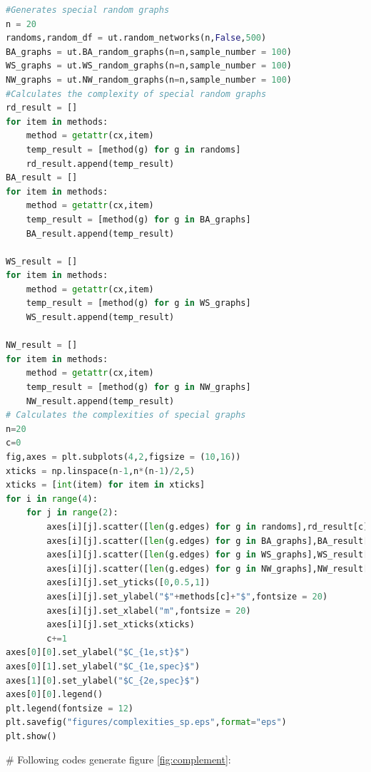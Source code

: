 \documentclass[12pt]{article}
\begin{document}
\begin{lstlisting}[breaklines=true,language=Python]
#Generates special random graphs
n = 20
randoms,random_df = ut.random_networks(n,False,500)
BA_graphs = ut.BA_random_graphs(n=n,sample_number = 100)
WS_graphs = ut.WS_random_graphs(n=n,sample_number = 100)
NW_graphs = ut.NW_random_graphs(n=n,sample_number = 100)
#Calculates the complexity of special random graphs
rd_result = []
for item in methods:
    method = getattr(cx,item)
    temp_result = [method(g) for g in randoms]
    rd_result.append(temp_result)
BA_result = []
for item in methods:
    method = getattr(cx,item)
    temp_result = [method(g) for g in BA_graphs]
    BA_result.append(temp_result)

WS_result = []
for item in methods:
    method = getattr(cx,item)
    temp_result = [method(g) for g in WS_graphs]
    WS_result.append(temp_result)

NW_result = []
for item in methods:
    method = getattr(cx,item)
    temp_result = [method(g) for g in NW_graphs]
    NW_result.append(temp_result)
# Calculates the complexities of special graphs
n=20
c=0
fig,axes = plt.subplots(4,2,figsize = (10,16))
xticks = np.linspace(n-1,n*(n-1)/2,5)
xticks = [int(item) for item in xticks]
for i in range(4):
    for j in range(2):
        axes[i][j].scatter([len(g.edges) for g in randoms],rd_result[c],s=15,color = "black",alpha = 0.7,label = "$G(n,m)$")
        axes[i][j].scatter([len(g.edges) for g in BA_graphs],BA_result[c],s=15,color = "green",label = "BA")
        axes[i][j].scatter([len(g.edges) for g in WS_graphs],WS_result[c],marker = "x",s=15,color = "red",label = "WS")
        axes[i][j].scatter([len(g.edges) for g in NW_graphs],NW_result[c],marker = "s",s=15,color = "blue",label = "NW")
        axes[i][j].set_yticks([0,0.5,1])
        axes[i][j].set_ylabel("$"+methods[c]+"$",fontsize = 20)
        axes[i][j].set_xlabel("m",fontsize = 20)
        axes[i][j].set_xticks(xticks)
        c+=1
axes[0][0].set_ylabel("$C_{1e,st}$")
axes[0][1].set_ylabel("$C_{1e,spec}$")
axes[1][0].set_ylabel("$C_{2e,spec}$")
axes[0][0].legend()
plt.legend(fontsize = 12)
plt.savefig("figures/complexities_sp.eps",format="eps")
plt.show()
\end{lstlisting}
\noindent
\newline
\# Following codes generate figure \ref{fig:complement}:
\end{document}
